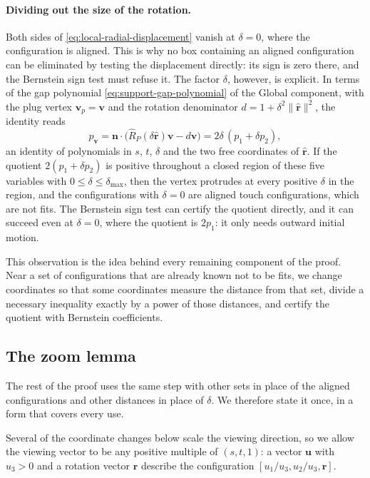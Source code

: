 \paragraph{Dividing out the size of the rotation.}
Both sides of \cref{eq:local-radial-displacement} vanish at $\delta=0$,
where the configuration is aligned. This is why no box containing an
aligned configuration can be eliminated by testing the displacement
directly: its sign is zero there, and the Bernstein sign test must refuse
it. The factor $\delta$, however, is explicit. In terms of the gap
polynomial \cref{eq:support-gap-polynomial} of the Global component,
with the plug vertex $\mathbf v_p=\mathbf v$ and the rotation denominator
$d=1+\delta^2\lVert\widehat{\mathbf r}\rVert^2$, the identity reads
\begin{equation}\label{eq:local-gap-factorisation}
  p_{\mathbf v}
   =\mathbf n\cdot\bigl(\widehat R_P(\delta\widehat{\mathbf r})\mathbf v-d\mathbf v\bigr)
   =2\delta\,(p_1+\delta p_2),
\end{equation}
an identity of polynomials in $s$, $t$, $\delta$ and the two free
coordinates of $\widehat{\mathbf r}$. If the quotient $2(p_1+\delta p_2)$
is positive throughout a closed region of these five variables with
$0\le\delta\le\delta_{\max}$, then the vertex protrudes at every
positive $\delta$ in the region, and the configurations with $\delta=0$ are
aligned touch configurations, which are not fits. The Bernstein sign test
can certify the quotient directly, and it can succeed even at $\delta=0$,
where the quotient is $2p_1$: it only needs outward initial motion.

This observation is the idea behind every remaining component of the
proof. Near a set of configurations that are already known not to be fits,
we change coordinates so that some coordinates measure the distance from
that set, divide a necessary inequality exactly by a power of those
distances, and certify the quotient with Bernstein coefficients.

\subsection{The zoom lemma}\label{subsec:the-zoom-lemma}

The rest of the proof uses the same step with other sets in place of the
aligned configurations and other distances in place of $\delta$. We
therefore state it once, in a form that covers every use.

Several of the coordinate changes below scale the viewing direction, so we
allow the viewing vector to be any positive multiple of $(s,t,1)$: a vector
$\mathbf u$ with $u_3>0$ and a rotation vector $\mathbf r$ describe the
configuration $[u_1/u_3,u_2/u_3,\mathbf r]$.

